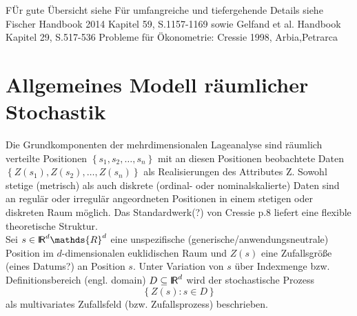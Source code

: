 FÜr gute Übersicht siehe \cite[S.104]{waller_applied_2004}
Für umfangreiche und tiefergehende Details siehe Fischer Handbook 2014 Kapitel 59, S.1157-1169
sowie Gelfand et al. Handbook Kapitel 29, S.517-536 
Probleme für Ökonometrie: Cressie 1998, Arbia,Petrarca


% 

\section{Allgemeines Modell räumlicher Stochastik}

Die Grundkomponenten der mehrdimensionalen Lageanalyse sind räumlich verteilte Positionen 
$\left\{ s_1 , s_2 ,\ldots , s_n \right\}$ mit an diesen Positionen beobachtete 
Daten $\left\{ Z(s_1),Z(s_2),\ldots,Z(s_n) \right\}$ als Realisierungen des Attributes Z. 
Sowohl stetige (metrisch) als auch diskrete (ordinal- oder nominalskalierte) Daten sind 
an regulär oder irregulär angeordneten Positionen in einem stetigen oder diskreten Raum möglich. 
Das Standardwerk(?) von Cressie p.8 liefert eine flexible theoretische Struktur. \\

Sei $s \in \RR^d \mathds{R}^d $ eine unspezifische (generische/anwendungsneutrale) Position 
im $d$-dimensionalen euklidischen Raum 
und $Z(s)$ eine Zufallsgröße (eines Datums?) an Position $s$. 
Unter Variation von $s$ über Indexmenge bzw. Definitionsbereich (engl. domain) $D \subseteq {\sf I\kern-0.14emR}^d$ 
wird der stochastische Prozess 
\begin{equation*}
    \left\{ Z(s):s \in D \right\}
\end{equation*}
als multivariates Zufallsfeld (bzw. Zufallsprozess) beschrieben.

